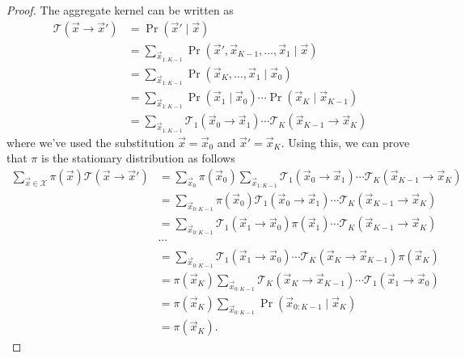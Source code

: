 \begin{proof}
    The aggregate kernel can be written as
    \begin{align}
        \mathcal T(\vec x \to \vec x')  &= \Pr(\vec x' \mid \vec x) \\
                                        &= \sum_{\vec x_{1:K - 1}} \Pr(\vec x', \vec x_{K-1}, \dotsc, \vec x_1 \mid \vec x) \\
                                        &= \sum_{\vec x_{1:K - 1}} \Pr(\vec x_K, \dotsc, \vec x_1 \mid \vec x_0) \\
                                        &= \sum_{\vec x_{1:K - 1}} \Pr(\vec x_1 \mid \vec x_0) \dotsm \Pr(\vec x_K \mid \vec x_{K - 1})\\
                                        &= \sum_{\vec x_{1:K - 1}} \mathcal T_1(\vec x_0 \to \vec x_1) \dotsm \mathcal T_K(\vec x_{K-1} \to \vec x_K)
    \end{align}
    where we've used the substitution $\vec x = \vec x_0$ and $\vec x' = \vec x_K$. Using this, we can prove that $\pi$ is the stationary distribution as follows
    \begin{align}
        \sum_{\vec x \in \mathcal X} \pi(\vec x)\mathcal T(\vec x \to \vec x')  &= \sum_{\vec x_0} \pi(\vec x_0) \sum_{\vec x_{1:K - 1}} \mathcal T_1(\vec x_0 \to \vec x_1) \dotsm \mathcal T_K(\vec x_{K-1} \to \vec x_K) \\
                                                                                &= \sum_{\vec x_{0:K - 1}} \pi(\vec x_0)\mathcal T_1(\vec x_0 \to \vec x_1) \dotsm \mathcal T_K(\vec x_{K-1} \to \vec x_K) \\
                                                                                &= \sum_{\vec x_{0:K - 1}} \mathcal T_1(\vec x_1 \to \vec x_0) \pi(\vec x_1) \dotsm \mathcal T_K(\vec x_{K-1} \to \vec x_K) \\
                                                                                &\cdots \nonumber \\
                                                                                &= \sum_{\vec x_{0:K - 1}} \mathcal T_1(\vec x_1 \to \vec x_0) \dotsm \mathcal T_K(\vec x_K \to \vec x_{K-1})\pi(\vec x_K) \\
                                                                                &= \pi(\vec x_K) \sum_{\vec x_{0:K - 1}} \mathcal T_K(\vec x_K \to \vec x_{K-1}) \dotsm \mathcal T_1(\vec x_1 \to \vec x_0) \\
                                                                                &= \pi(\vec x_K) \sum_{\vec x_{0:K - 1}} \Pr(\vec x_{0:K - 1} \mid \vec x_K) \\
                                                                                &= \pi(\vec x_K).
    \end{align}
\end{proof}